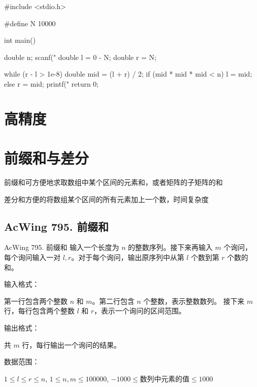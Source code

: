 \begin{mycpptwocol}[数的三次方根]
    #include <stdio.h>

    #define N 10000

    int main() {
        double n;
        scanf("%
        double l = 0 - N;
        double r = N;

        while (r - l > 1e-8) {
            double mid = (l + r) / 2;
            if (mid * mid * mid < n) {
                l = mid;
            } else {
                r = mid;
            }
        }
        printf("%
        return 0;
    }
\end{mycpptwocol}


\section{高精度}


\section{前缀和与差分}
\begin{myenum}
    \item 前缀和可方便地求取数组中某个区间的元素和，或者矩阵的子矩阵的和 
    \item 差分和方便的将数组某个区间的所有元素加上一个数，时间复杂度
\end{myenum}

\subsection{AcWing 795. 前缀和}
\begin{titledbox}{AcWing 795. 前缀和}
    输入一个长度为 $n$ 的整数序列。接下来再输入 $m$ 个询问，每个询问输入一对 $l, r$。对于每个询问，输出原序列中从第 $l$ 个数到第 $r$ 个数的和。

    输入格式：

    第一行包含两个整数 $n$ 和 $m$。第二行包含 $n$ 个整数，表示整数数列。
    接下来 $m$ 行，每行包含两个整数 $l$ 和 $r$，表示一个询问的区间范围。

    输出格式：

    共 $m$ 行，每行输出一个询问的结果。

    数据范围：

    $1 \le l \le r \le n$, $1 \le n,m \le 100000$, $-1000 \le \text{数列中元素的值} \le 1000$

    \begin{inputblock}
         \\
         \\
         \\
         \\
    \end{inputblock}
    \begin{outputblock}
         \\
         \\
    \end{outputblock}
\end{titledbox}

